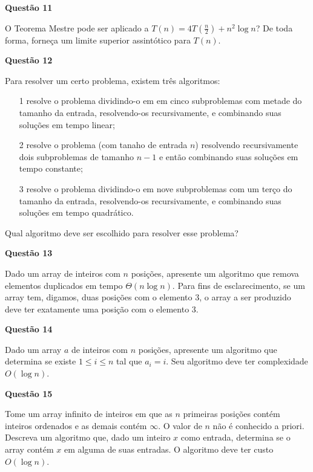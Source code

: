 \documentclass[]{article}
\begin{document}
\vspace{\baselineskip}

\textbf{Questão 11}

O Teorema Mestre pode ser aplicado a $T(n) = 4T(\frac{n}{2}) + n^2\log n$?
De toda forma, forneça um limite superior assintótico para $T(n)$.

\vspace{\baselineskip}

\textbf{Questão 12}

Para resolver um certo problema, existem três algoritmos:
\begin{itemize}
  \item[1] resolve o problema dividindo-o em em cinco subproblemas com metade do tamanho da entrada, resolvendo-os recursivamente, e combinando suas soluções em tempo linear;
  \item[2] resolve o problema (com tanaho de entrada $n$) resolvendo recursivamente dois subproblemas de tamanho $n - 1$ e então combinando suas soluções em tempo constante;
  \item[3] resolve o problema dividindo-o em nove subproblemas com um terço do tamanho da entrada, resolvendo-os recursivamente, e combinando suas soluções em tempo quadrático.
\end{itemize}

Qual algoritmo deve ser escolhido para resolver esse problema?

\vspace{\baselineskip}

\textbf{Questão 13}

Dado um array de inteiros com $n$ posições, apresente um algoritmo que remova elementos duplicados em tempo $\Theta(n \log n)$.
Para fins de esclarecimento, se um array tem, digamos, duas posições com o elemento $3$, o array a ser produzido deve ter exatamente uma posição com o elemento $3$.

\vspace{\baselineskip}

\textbf{Questão 14}

Dado um array $a$ de inteiros com $n$ posições, apresente um algoritmo que determina se existe $1 \leq i \leq n$ tal que $a_i = i$.
Seu algoritmo deve ter complexidade $O(\log n)$.

\vspace{\baselineskip}

\textbf{Questão 15}

Tome um array infinito de inteiros em que as $n$ primeiras posições contém inteiros ordenados e as demais contém $\infty$.
O valor de $n$ não é conhecido a priori.
Descreva um algoritmo que, dado um inteiro $x$ como entrada, determina se o array contém $x$ em alguma de suas entradas.
O algoritmo deve ter custo $O(\log n)$.
\end{document}
